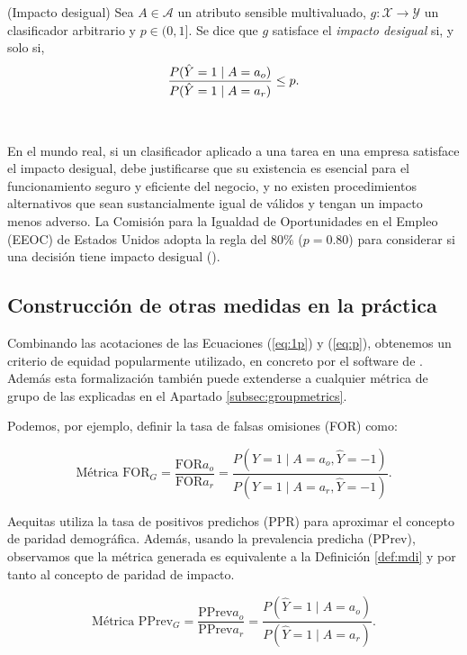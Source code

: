 \documentclass[oneside,openright,titlepage,numbers=noenddot,openany,headinclude,footinclude=true,
cleardoublepage=empty,abstractoff,BCOR=5mm,paper=a4,fontsize=12pt,main=spanish]{scrreprt}
\begin{document}
\begin{definition}(Impacto desigual) \label{def:mdi}
Sea $A \in \mathcal{A}$ un atributo sensible multivaluado, $g\colon \mathcal{X} \to \mathcal{Y}$ un clasificador arbitrario y $p\in (0,1]$. Se dice que $g$ satisface el \textit{impacto desigual} si, y solo si,
\begin{equation} \label{eq:1p}
    \frac{\displaystyle P(\hat{Y}=1 \mid A=a_o)}{\displaystyle P(\hat{Y}=1 \mid A=a_r)}\leq p.
\end{equation}
\end{definition}\

En el mundo real, si un clasificador aplicado a una tarea en una empresa satisface el impacto desigual, debe justificarse que su existencia es esencial para el funcionamiento seguro y eficiente del negocio, y no existen procedimientos alternativos que sean sustancialmente igual de válidos y tengan un impacto menos adverso. La Comisión para la Igualdad de Oportunidades en el Empleo (EEOC) de Estados Unidos adopta la regla del $80\%$ ($p = 0.80$) para considerar si una decisión tiene impacto desigual (\cite{adverse2009}).

\subsection*{Construcción de otras medidas en la práctica}

Combinando las acotaciones de las Ecuaciones (\ref{eq:1p}) y (\ref{eq:p}), obtenemos un criterio de equidad popularmente utilizado, en concreto por el software de \cite{aequitasdoc}. Además esta formalización también puede extenderse a cualquier métrica de grupo de las explicadas en el Apartado \ref{subsec:groupmetrics}.

Podemos, por ejemplo, definir la tasa de falsas omisiones (FOR) como:

\begin{equation*} 
\text{Métrica FOR}_G =\frac{\text{FOR}{a_o}}{\text{FOR}{a_r}}=\frac{P(Y=1 \mid A=a_o, \hat{Y}=-1)}{P(Y=1 \mid A=a_r, \hat{Y}=-1)}.
\end{equation*}

Aequitas utiliza la tasa de positivos predichos (PPR) para aproximar el concepto de paridad demográfica. Además, usando la prevalencia predicha (PPrev), observamos que la métrica generada es equivalente a la Definición \ref{def:mdi} y por tanto al concepto de paridad de impacto.

\begin{equation*} 
\text{Métrica PPrev}_G=\frac{\text{PPrev}{a_o}}{\text{PPrev}{a_r}}=\frac{P(\hat{Y}=1 \mid A=a_o)}{P(\hat{Y}=1 \mid A=a_r)}.
\end{equation*}
\end{document}
